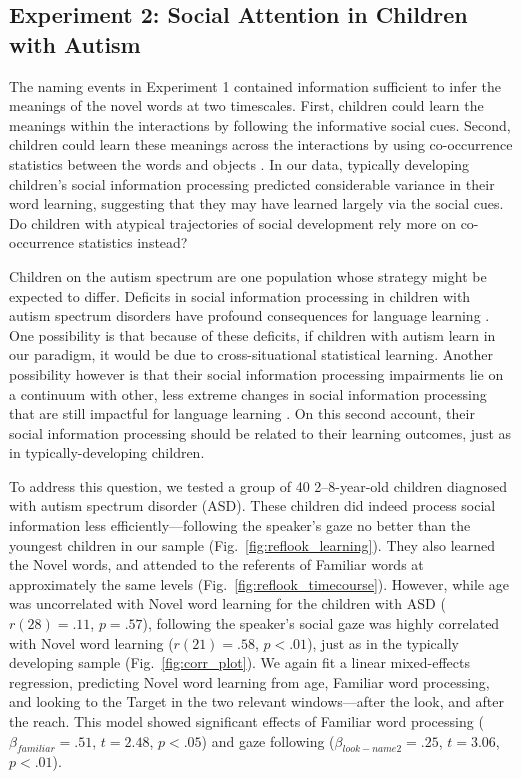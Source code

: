 \documentclass{pnastwo}
\begin{document}
\begin{article}
\section{Experiment 2: Social Attention in Children with Autism}

The naming events in Experiment 1 contained information sufficient to infer the meanings of the novel words at two timescales. First, children could learn the meanings within the interactions by following the informative social cues. Second, children could learn these meanings across the interactions by using co-occurrence statistics between the words and objects \citep{smith2008}. In our data, typically developing children's social information processing predicted considerable variance in their word learning, suggesting that they may have learned largely via the social cues. Do children with atypical trajectories of social development rely more on co-occurrence statistics instead?

Children on the autism spectrum are one population whose strategy might be expected to differ. Deficits in social information processing in children with autism spectrum disorders have profound consequences for language learning \cite{baron-cohen1997,leekam1998}. One possibility is that because of these deficits, if children with autism learn in our paradigm, it would be due to cross-situational statistical learning. Another possibility however is that their social information processing impairments lie on a continuum with other, less extreme changes in social information processing that are still impactful for language learning \cite{brooks2005}. On this second account, their social information processing should be related to their learning outcomes, just as in typically-developing children.

To address this question, we tested a group of 40 2--8-year-old children diagnosed with autism spectrum disorder (ASD). These children did indeed process social information less efficiently---following the speaker's gaze no better than the youngest children in our sample (Fig.~\ref{fig:reflook_learning}). They also learned the Novel words, and attended to the referents of Familiar words at approximately the same levels (Fig.~\ref{fig:reflook_timecourse}). However, while age was uncorrelated with Novel word learning for the children with ASD ($r(28) = .11$, $p =.57$), following the speaker's social gaze was highly correlated with Novel word learning ($r(21) = .58$, $p <.01$), just as in the typically developing sample (Fig.~\ref{fig:corr_plot}). We again fit a linear mixed-effects regression, predicting Novel word learning from age, Familiar word processing, and looking to the Target in the two relevant windows---after the look, and after the reach. This model showed significant effects of Familiar word processing ($\beta_{familiar} = .51$, $t = 2.48$, $p < . 05$) and gaze following ($\beta_{look-name2} = .25$, $t = 3.06$, $p < .01$).


\end{article}
\end{document}
